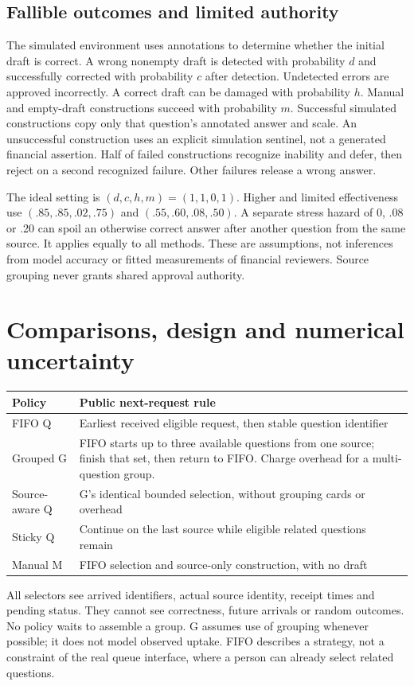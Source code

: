 \documentclass[10pt,a4paper]{article}
\begin{document}
\subsection{Fallible outcomes and limited authority}
The simulated environment uses annotations to determine whether the initial
draft is correct. A wrong nonempty draft is detected with probability $d$ and
successfully corrected with probability $c$ after detection. Undetected errors are
approved incorrectly. A correct draft can be damaged with probability $h$.
Manual and empty-draft constructions succeed with probability $m$. Successful
simulated constructions copy only that question's annotated answer and scale.
An unsuccessful construction uses an explicit simulation sentinel, not a generated
financial assertion. Half of failed constructions recognize inability and defer,
then reject on a second recognized failure. Other failures release a wrong answer.

The ideal setting is $(d,c,h,m)=(1,1,0,1)$. Higher and limited effectiveness use
$(.85,.85,.02,.75)$ and $(.55,.60,.08,.50)$. A separate stress hazard of
0, .08 or .20 can spoil an otherwise correct answer after another question from
the same source. It applies equally to all methods. These are assumptions, not
inferences from model accuracy or fitted measurements of financial reviewers.
Source grouping never grants shared approval authority.

\clearpage
\section{Comparisons, design and numerical uncertainty}
\begin{center}\small
\begin{tabular}{p{.22\linewidth}p{.69\linewidth}}
\toprule
Policy & Public next-request rule\\\midrule
FIFO Q & Earliest received eligible request, then stable question identifier\\
Grouped G & FIFO starts up to three available questions from one source; finish
that set, then return to FIFO. Charge overhead for a multi-question group.\\
Source-aware Q & G's identical bounded selection, without grouping cards or overhead\\
Sticky Q & Continue on the last source while eligible related questions remain\\
Manual M & FIFO selection and source-only construction, with no draft\\\bottomrule
\end{tabular}\end{center}
All selectors see arrived identifiers, actual source identity, receipt times and
pending status. They cannot see correctness, future arrivals or random outcomes.
No policy waits to assemble a group. G assumes use of grouping whenever possible;
it does not model observed uptake. FIFO describes a strategy, not a constraint of
the real queue interface, where a person can already select related questions.
\end{document}
